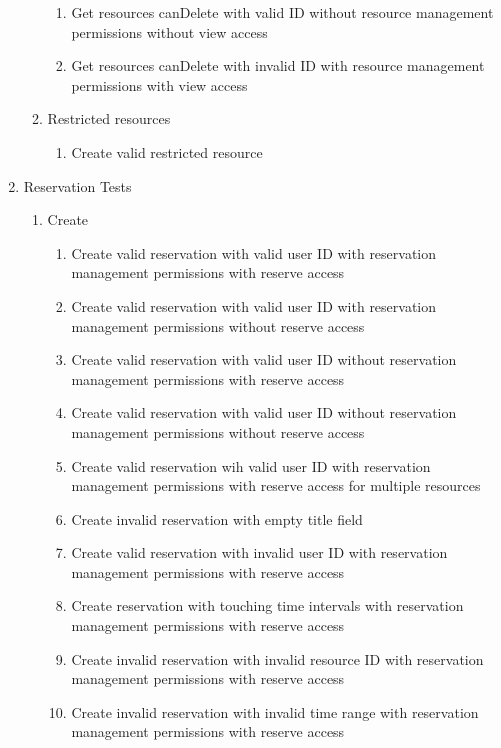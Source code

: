 \documentclass[12pt]{article}
\begin{document}
\begin{enumerate}
\begin{enumerate}
\begin{enumerate}
            \item Get resources canDelete with valid ID without resource management permissions without view access
            \item Get resources canDelete with invalid ID with resource management permissions with view access
            \end{enumerate}
        \item Restricted resources
        \begin{enumerate}
            \item Create valid restricted resource
        \end{enumerate}
    \end{enumerate}
    \item Reservation Tests
    \begin{enumerate}
        \item Create
        \begin{enumerate}
            \item Create valid reservation with valid user ID with reservation management permissions with reserve access
            \item Create valid reservation with valid user ID with reservation management permissions without reserve access
            \item Create valid reservation with valid user ID without reservation management permissions with reserve access
            \item Create valid reservation with valid user ID without reservation management permissions without reserve access
            \item Create valid reservation wih valid user ID with reservation management permissions with reserve access for multiple resources
            \item Create invalid reservation with empty title field
            \item Create valid reservation with invalid user ID with reservation management permissions with reserve access
            \item Create reservation with touching time intervals with reservation management permissions with reserve access
            \item Create invalid reservation with invalid resource ID with reservation management permissions with reserve access
            \item Create invalid reservation with invalid time range with reservation management permissions with reserve access    

\end{enumerate}
\end{enumerate}
\end{enumerate}
\end{document}
